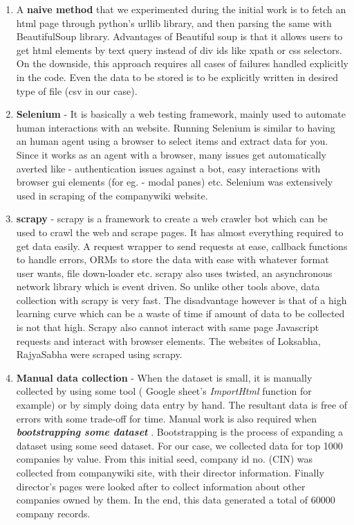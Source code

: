 \begin{enumerate}

    \item A \textbf{ naive method } that we experimented during the initial work is to fetch an html page through python's urllib library, and then parsing the same with BeautifulSoup library. Advantages of Beautiful soup is that it allows users to get html elements by text query instead of div ids like xpath or css selectors. On the downside, this approach requires all cases of failures handled explicitly in the code. Even the data to be stored is to be explicitly written in desired type of file (csv in our case).

    \item \textbf{ Selenium } - It is basically a web testing framework, mainly used to automate human interactions with an website. Running Selenium is similar to having an human agent using a browser to select items and extract data for you. Since it works as an agent with a browser, many issues get automatically averted like - authentication issues against a bot, easy interactions with browser gui elements (for eg. - modal panes) etc. Selenium was extensively used in scraping of the companywiki website.

    \item \textbf{ scrapy } - scrapy is a framework to create a web crawler bot which can be used to crawl the web and scrape pages. It has almost everything required to get data easily. A request wrapper to send requests at ease, callback functions to handle errors, ORMs to store the data with ease with whatever format user wants, file down-loader etc. scrapy also uses twisted, an asynchronous network library which is event driven. So unlike other tools above, data collection with scrapy is very fast. The disadvantage however is that of a high learning curve which can be a waste of time if amount of data to be collected is not that high. Scrapy also cannot interact with same page Javascript requests and interact with browser elements. The websites of Loksabha, RajyaSabha were scraped using scrapy.

    \item \textbf{ Manual data collection } - When the dataset is small, it is manually collected by using some tool ( Google sheet's \emph{ ImportHtml } function for example) or by simply doing data entry by hand. The resultant data is free of errors with some trade-off for time. Manual work is also required when \textbf {\emph { bootstrapping some dataset } }. Bootstrapping is the process of expanding a dataset using some seed dataset. For our case, we collected data for top 1000 companies by value. From this initial seed, company id no. (CIN) was collected from companywiki site, with their director information. Finally director's pages were looked after to collect information about other companies owned by them. In the end, this data generated a total of 60000 company records.


\end{enumerate}
